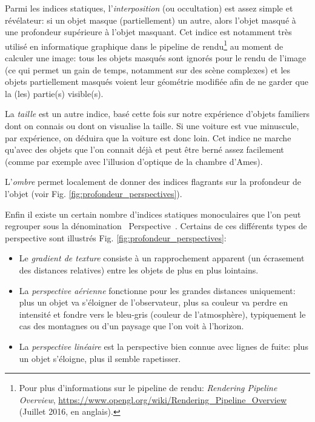 	\par Parmi les indices statiques, l'\textit{interposition} (ou occultation) est assez simple et révélateur: si un objet masque (partiellement) un autre, alors l'objet masqué à une profondeur supérieure à l'objet masquant. Cet indice est notamment très utilisé en informatique graphique dans le pipeline de rendu\footnote{Pour plus d'informations sur le pipeline de rendu: \textit{Rendering Pipeline Overview}, \url{https://www.opengl.org/wiki/Rendering_Pipeline_Overview} (Juillet 2016, en anglais).} au moment de calculer une image: tous les objets masqués sont ignorés pour le rendu de l'image (ce qui permet un gain de temps, notamment sur des scène complexes) et les objets partiellement masqués voient leur géométrie modifiée afin de ne garder que la (les) partie(s) visible(s).
	
	\par La \textit{taille} est un autre indice, basé cette fois sur notre expérience d'objets familiers dont on connais ou dont on visualise la taille. Si une voiture est vue minuscule, par expérience, on déduira que la voiture est donc loin. Cet indice ne marche qu'avec des objets que l'on connait déjà et peut être berné assez facilement (comme par exemple avec l'illusion d'optique de la chambre d'Ames).
		
	\par L'\textit{ombre} permet localement de donner des indices flagrants sur la profondeur de l'objet (voir Fig. \ref{fig:profondeur_perspectives}).
	
	\par Enfin il existe un certain nombre d'indices statiques monoculaires \citep{glassner_principles_1995, fuchs_traite_2003} que l'on peut regrouper sous la dénomination \guillemotleft~Perspective~\guillemotright . Certains de ces différents types de perspective sont illustrés Fig. \ref{fig:profondeur_perspectives}:
	\begin{itemize}
		\item Le \textit{gradient de texture} consiste à un rapprochement apparent (un écrasement des distances relatives) entre les objets de plus en plus lointains.
		\item La \textit{perspective aérienne} fonctionne pour les grandes distances uniquement: plus un objet va s'éloigner de l'observateur, plus sa couleur va perdre en intensité et fondre vers le bleu-gris (couleur de l'atmosphère), typiquement le cas des montagnes ou d'un paysage que l'on voit à l'horizon.	
		\item La \textit{perspective linéaire} est la perspective bien connue avec lignes de fuite: plus un objet s'éloigne, plus il semble rapetisser.
	\end{itemize}
	
